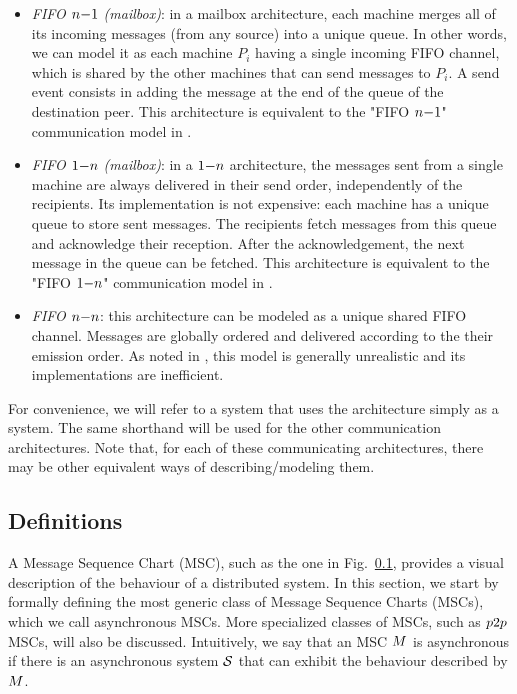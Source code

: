 \documentclass{article}
\begin{document}
\begin{itemize}
	\item \emph{FIFO $n\mathsf{-}1$ (mailbox)}: in a mailbox architecture, each machine merges all of its incoming messages (from any source) into a unique queue. In other words, we can model it as each machine $P_i$ having a single incoming FIFO channel, which is shared by the other machines that can send messages to $P_i$. A send event consists in adding the message at the end of the queue of the destination peer. This architecture is equivalent to the "FIFO $n\mathsf{-}1$" communication model in \cite{DBLP:journals/fac/ChevrouHQ16}.
	\item \emph{FIFO $1\mathsf{-}n$ (mailbox)}: in a $1\mathsf{-}n$ architecture, the messages sent from a single machine are always delivered in their send order, independently of the recipients. Its implementation is
	not expensive: each machine has a unique queue to store sent messages. The recipients fetch messages from this queue and acknowledge their reception. After the acknowledgement, the next message in the queue can be fetched. This architecture is equivalent to the "FIFO $1\mathsf{-}n$" communication model in \cite{DBLP:journals/fac/ChevrouHQ16}.
	\item \emph{FIFO $n\mathsf{-}n$}: this architecture can be modeled as a unique shared FIFO channel. Messages are globally ordered and delivered according to the their emission order. As noted in \cite{DBLP:journals/fac/ChevrouHQ16}, this model is generally unrealistic and its implementations are inefficient.

\end{itemize}
For convenience, we will refer to a system that uses the \pp architecture simply as a \pp system. The same shorthand will be used for the other communication architectures. Note that, for each of these communicating architectures, there may be other equivalent ways of describing/modeling them.

\subsection{Definitions}

A Message Sequence Chart (MSC), such as the one in Fig.~\ref{}, provides a visual description of the behaviour of a distributed system. In this section, we start by formally defining the most generic class of Message Sequence Charts (MSCs), which we call asynchronous MSCs. More specialized classes of MSCs, such as $p2p$ MSCs, will also be discussed. Intuitively, we say that an MSC $M$ is asynchronous if there is an asynchronous system $\mathcal{S}$ that can exhibit the behaviour described by $M$. 
\end{document}

